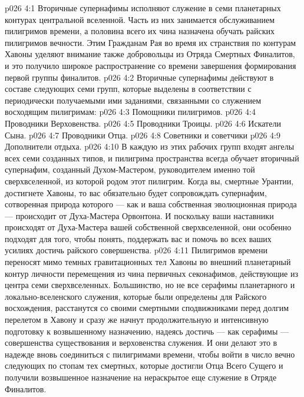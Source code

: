 \vs p026 4:1 Вторичные супернафимы исполняют служение в семи планетарных контурах центральной вселенной. Часть из них занимается обслуживанием пилигримов времени, а половина всего их чина назначена обучать райских пилигримов вечности. Этим Гражданам Рая во время их странствия по контурам Хавоны уделяют внимание также добровольцы из Отряда Смертных Финалитов, и это получило широкое распространение со времени завершения формирования первой группы финалитов.
\vs p026 4:2 \pc Вторичные супернафимы действуют в составе следующих семи групп, которые выделены в соответствии с периодически получаемыми ими заданиями, связанными со служением восходящим пилигримам:
\vs p026 4:3 \bibnobreakspace Помощники пилигримов.
\vs p026 4:4 \bibnobreakspace Проводники Верховенства.
\vs p026 4:5 \bibnobreakspace Проводники Троицы.
\vs p026 4:6 \bibnobreakspace Искатели Сына.
\vs p026 4:7 \bibnobreakspace Проводники Отца.
\vs p026 4:8 \bibnobreakspace Советники и советчики
\vs p026 4:9 \bibnobreakspace Дополнители отдыха.
\vs p026 4:10 \pc В каждую из этих рабочих групп входят ангелы всех семи созданных типов, и пилигрима пространства всегда обучает вторичный супернафим, созданный Духом\hyp{}Мастером, руководителем именно той сверхвселенной, из которой родом этот пилигрим. Когда вы, смертные Урантии, достигнете Хавоны, то вас обязательно будет сопровождать супернафим, сотворенная природа которого --- как и ваша собственная эволюционная природа --- происходит от Духа\hyp{}Мастера Орвонтона. И поскольку ваши наставники происходят от Духа\hyp{}Мастера вашей собственной сверхвселенной, они особенно подходят для того, чтобы понять, поддержать вас и помочь во всех ваших усилиях достичь райского совершенства.
\vs p026 4:11 Пилигримов времени переносят мимо темных гравитационных тел Хавоны во внешний планетарный контур личности перемещения из чина первичных секонафимов, действующие из центра семи сверхвселенных. Большинство, но не все серафимы планетарного и локально\hyp{}вселенского служения, которые были определены для Райского восхождения, расстанутся со своими смертными сподвижниками перед долгим перелетом в Хавону и сразу же начнут продолжительную и интенсивную подготовку к возвышенному назначению, надеясь достичь --- как серафимы --- совершенства существования и верховенства служения. И они делают это в надежде вновь соединиться с пилигримами времени, чтобы войти в число вечно следующих по стопам тех смертных, которые достигли Отца Всего Сущего и получили возвышенное назначение на нераскрытое еще служение в Отряде Финалитов.
